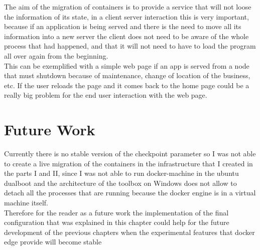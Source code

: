 The aim of the migration of containers is to provide a service that will not loose the information of its state, in a client server interaction this is very important, because if an application is being served and there is the need to move all its information into a new server the client does not need to be aware of the whole process that had happened, and that it will not need to have to load the program all over again from the beginning.\\

This can be exemplified with a simple web page if an app is served from a node that must shutdown because of maintenance, change of location of the business, etc. If the user reloads the page and it comes back to the home page could be a really big problem for the end user interaction with the web page.

\chapter{Future Work}

Currently there is no stable version of the checkpoint parameter so I was not able to create a live migration of the containers in the infrastructure that I created in the parts I and II, since I was not able to run docker-machine in the ubuntu dualboot and the architecture of the toolbox on Windows does not allow to detach all the processes that are running because the docker engine is in a virtual machine itself. \\

Therefore for the reader as a future work the implementation of the final configuration that was explained in this chapter could help for the future development of the previous chapters when the experimental features that docker edge provide will become stable 